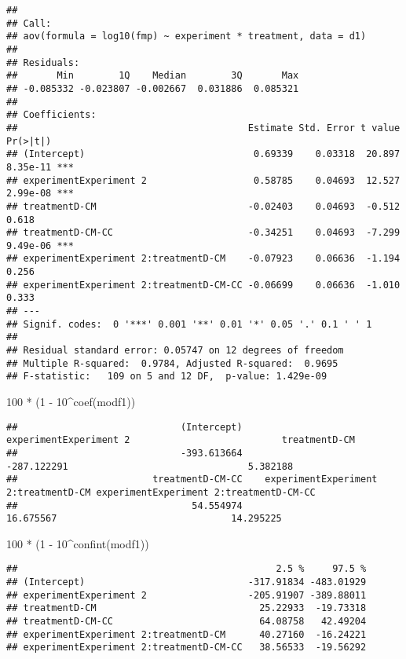 \documentclass[
]{article}
\newenvironment{Shaded}{\begin{snugshade}}{\end{snugshade}}
\newcommand{\DecValTok}[1]{\textcolor[rgb]{0.00,0.00,0.81}{#1}}
\newcommand{\FunctionTok}[1]{\textcolor[rgb]{0.00,0.00,0.00}{#1}}
\newcommand{\NormalTok}[1]{#1}
\newcommand{\SpecialCharTok}[1]{\textcolor[rgb]{0.00,0.00,0.00}{#1}}
\begin{document}
\begin{verbatim}
## 
## Call:
## aov(formula = log10(fmp) ~ experiment * treatment, data = d1)
## 
## Residuals:
##       Min        1Q    Median        3Q       Max 
## -0.085332 -0.023807 -0.002667  0.031886  0.085321 
## 
## Coefficients:
##                                         Estimate Std. Error t value Pr(>|t|)    
## (Intercept)                              0.69339    0.03318  20.897 8.35e-11 ***
## experimentExperiment 2                   0.58785    0.04693  12.527 2.99e-08 ***
## treatmentD-CM                           -0.02403    0.04693  -0.512    0.618    
## treatmentD-CM-CC                        -0.34251    0.04693  -7.299 9.49e-06 ***
## experimentExperiment 2:treatmentD-CM    -0.07923    0.06636  -1.194    0.256    
## experimentExperiment 2:treatmentD-CM-CC -0.06699    0.06636  -1.010    0.333    
## ---
## Signif. codes:  0 '***' 0.001 '**' 0.01 '*' 0.05 '.' 0.1 ' ' 1
## 
## Residual standard error: 0.05747 on 12 degrees of freedom
## Multiple R-squared:  0.9784, Adjusted R-squared:  0.9695 
## F-statistic:   109 on 5 and 12 DF,  p-value: 1.429e-09
\end{verbatim}

\begin{Shaded}
\begin{Highlighting}[]
\DecValTok{100} \SpecialCharTok{*}\NormalTok{ (}\DecValTok{1} \SpecialCharTok{{-}} \DecValTok{10}\SpecialCharTok{\^{}}\FunctionTok{coef}\NormalTok{(modf1))}
\end{Highlighting}
\end{Shaded}

\begin{verbatim}
##                             (Intercept)                  experimentExperiment 2                           treatmentD-CM 
##                             -393.613664                             -287.122291                                5.382188 
##                        treatmentD-CM-CC    experimentExperiment 2:treatmentD-CM experimentExperiment 2:treatmentD-CM-CC 
##                               54.554974                               16.675567                               14.295225
\end{verbatim}

\begin{Shaded}
\begin{Highlighting}[]
\DecValTok{100} \SpecialCharTok{*}\NormalTok{ (}\DecValTok{1} \SpecialCharTok{{-}} \DecValTok{10}\SpecialCharTok{\^{}}\FunctionTok{confint}\NormalTok{(modf1))}
\end{Highlighting}
\end{Shaded}

\begin{verbatim}
##                                              2.5 %     97.5 %
## (Intercept)                             -317.91834 -483.01929
## experimentExperiment 2                  -205.91907 -389.88011
## treatmentD-CM                             25.22933  -19.73318
## treatmentD-CM-CC                          64.08758   42.49204
## experimentExperiment 2:treatmentD-CM      40.27160  -16.24221
## experimentExperiment 2:treatmentD-CM-CC   38.56533  -19.56292
\end{verbatim}
\end{document}
